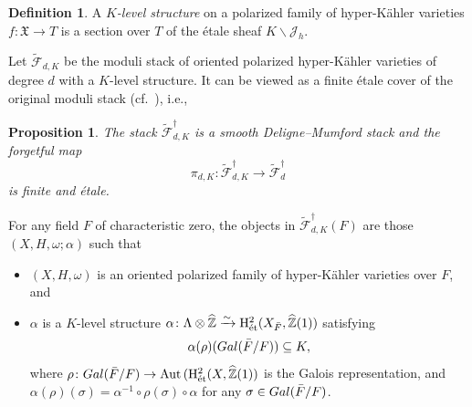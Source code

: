 \documentclass[11pt,reqno,oneside]{amsart}
\numberwithin{equation}{section}
\newtheorem{proposition}[theorem]{Proposition}
\theoremstyle{definition}
\newtheorem{definition}[theorem]{Definition}
\DeclareMathOperator{\Aut}{Aut}
\newcommand{\Gal}{{\rm Gal}}
\DeclareMathOperator{\et}{\Acute{e}t}
\newcommand{\scF}{\mathscr{F}}
\newcommand\rH{\mathrm{H}}
\newcommand{\ZZ}{\mathbb{Z}}
\newcommand{\fX}{\mathfrak{X}}
\begin{document}
\begin{definition}  
A \textit{$K$-level structure} on a polarized family of hyper-Kähler varieties $f\colon\fX \rightarrow T$ is a section over $T$ of the \'etale sheaf $K\backslash\mathcal{J}_h$.
\end{definition}



Let $\widetilde{\scF}_{d,K}$ be the moduli stack of oriented polarized hyper-Kähler varieties of degree $d$ with a $K$-level structure. It can be viewed as a finite \'etale cover of the original moduli stack (cf.~\cite[Proposition 3.11]{Pe15}), i.e.,
\begin{proposition}
The stack $\widetilde{\scF}_{d,K}^{\dag}$ is a smooth Deligne--Mumford stack  and the forgetful map 
\begin{equation*}
\pi_{d,K}\colon \widetilde{\scF}_{d,K}^{\dag} \rightarrow \widetilde{\scF}_d^{\dag}
\end{equation*}
is finite and \'etale. 
\end{proposition}

For any field $F$ of characteristic zero, the objects in $\widetilde{\scF}_{d,K}^{\dag}(F)$ are those $(X,H, \omega; \alpha)$ such that
\begin{itemize}
    \item $(X,H, \omega)$ is an oriented polarized family of hyper-Kähler varieties over $F$, and
    \item $\alpha$ is a $K$-level structure $\alpha \colon \Lambda \otimes \widehat{\ZZ} \xrightarrow{\sim} \rH^2_{\et}(X_{\bar{F}},\widehat{\ZZ}(1))$ satisfying
    \[
    \alpha(\rho)(\Gal(\bar{F}/F)) \subseteq K,
    \]
    where $\rho \colon \Gal(\bar{F}/F) \to \Aut{(\rH^2_{\et}(X, \widehat{\ZZ}(1))}$ is the Galois representation,  and $\alpha(\rho)(\sigma) = \alpha^{-1} \circ \rho(\sigma) \circ \alpha$ for any $\sigma \in \Gal(\bar{F}/F)$.
\end{itemize}
\end{document}
